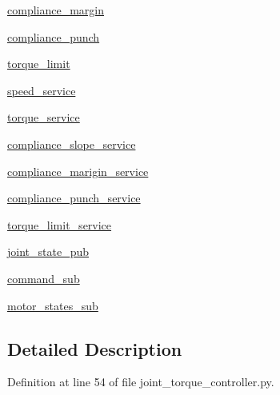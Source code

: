 \begin{DoxyCompactItemize}
\hyperlink{classdynamixel__controllers_1_1joint__controller_1_1_joint_controller_a27ef273b035027725534aa6ef45b6462}{compliance\+\_\+margin}
\item 
\hyperlink{classdynamixel__controllers_1_1joint__controller_1_1_joint_controller_a4e3ce35a23d0b5b961a43c0e1d9d14a6}{compliance\+\_\+punch}
\item 
\hyperlink{classdynamixel__controllers_1_1joint__controller_1_1_joint_controller_a5d555adb1d0f05be5b43d1fd54e6652a}{torque\+\_\+limit}
\item 
\hyperlink{classdynamixel__controllers_1_1joint__controller_1_1_joint_controller_ad08c30ce31dec43a50d834d45c1d669e}{speed\+\_\+service}
\item 
\hyperlink{classdynamixel__controllers_1_1joint__controller_1_1_joint_controller_ac033f7205e272cceafd190ad66dbd71e}{torque\+\_\+service}
\item 
\hyperlink{classdynamixel__controllers_1_1joint__controller_1_1_joint_controller_aff0ed417286fdd03e03ac8e3a446a45b}{compliance\+\_\+slope\+\_\+service}
\item 
\hyperlink{classdynamixel__controllers_1_1joint__controller_1_1_joint_controller_a91f03c9ccdece33a94f0bcb72c5bc582}{compliance\+\_\+marigin\+\_\+service}
\item 
\hyperlink{classdynamixel__controllers_1_1joint__controller_1_1_joint_controller_a65dbf0b3b19b26c009579e8853262276}{compliance\+\_\+punch\+\_\+service}
\item 
\hyperlink{classdynamixel__controllers_1_1joint__controller_1_1_joint_controller_a1555dcae38a12011ee6d11140bf6d6d7}{torque\+\_\+limit\+\_\+service}
\item 
\hyperlink{classdynamixel__controllers_1_1joint__controller_1_1_joint_controller_a05aab8618e98e299d5aaf86bd301229d}{joint\+\_\+state\+\_\+pub}
\item 
\hyperlink{classdynamixel__controllers_1_1joint__controller_1_1_joint_controller_a867bb1c6fc7084a725ff37a2c118d60d}{command\+\_\+sub}
\item 
\hyperlink{classdynamixel__controllers_1_1joint__controller_1_1_joint_controller_affc8be5e697a2ae71d284d8e0e59a4bd}{motor\+\_\+states\+\_\+sub}
\end{DoxyCompactItemize}


\subsection{Detailed Description}


Definition at line 54 of file joint\+\_\+torque\+\_\+controller.\+py.



